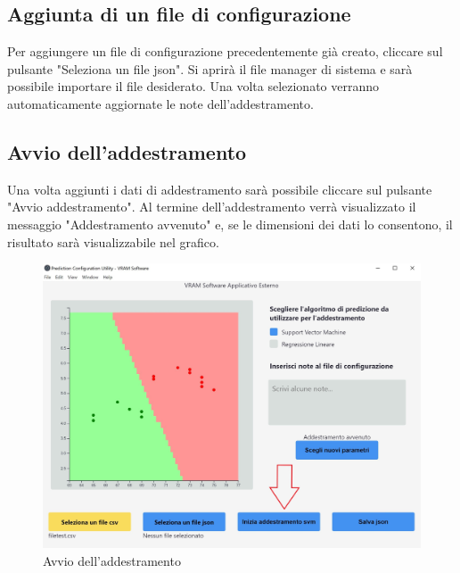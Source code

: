 	\subsection{Aggiunta di un file di configurazione}
	Per aggiungere un file di configurazione precedentemente già creato, cliccare sul pulsante "Seleziona un file json".
	Si aprirà il file manager di sistema e sarà possibile importare il file desiderato. Una volta selezionato verranno automaticamente aggiornate le note dell'addestramento.
	\subsection{Avvio dell'addestramento}
	Una volta aggiunti i dati di addestramento sarà possibile cliccare sul pulsante "Avvio addestramento". Al termine dell'addestramento verrà visualizzato il messaggio "Addestramento avvenuto" e, se le dimensioni dei dati lo consentono, il risultato sarà visualizzabile nel grafico.
	\begin{figure}[H] 	
		\begin{center}
			\includegraphics[width=\linewidth]{img/4-3.jpg}
		\end{center}
		\caption{Avvio dell'addestramento}	
	\end{figure}

